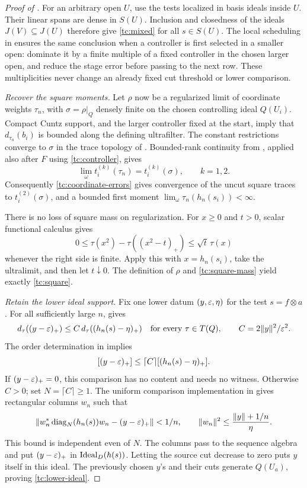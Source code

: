 \begin{proof}[Proof of ]
For an arbitrary open $U$, use the tests localized in basis ideals
inside $U$.  Their linear spans are dense in $S(U)$.  Inclusion and
closedness of the ideals $J(V)\subseteq J(U)$ therefore give
\eqref{tc:mixed} for all $s\in S(U)$.  The local scheduling in
 ensures the same conclusion when a controller is
first selected in a smaller open: dominate it by a finite multiple
of a fixed controller in the chosen larger open, and reduce the
stage error before passing to the next row.  These multiplicities
never change an already fixed cut threshold or lower comparison.

\smallskip\noindent\emph{Recover the square moments.} 
Let $\rho$ now be a regularized limit of coordinate weights $\tau_n$,
with $\sigma=\rho|_Q$ densely finite on the chosen controlling ideal
$Q(U_i)$.  Compact Cuntz support, and the larger controller fixed at
the start, imply that $d_{\tau_n}(b_i)$ is bounded along the defining
ultrafilter.  The constant restrictions converge to $\sigma$ in the
trace topology of .  Bounded-rank continuity
from , applied also after $F$ using
\eqref{tc:controller}, gives
\[
 \lim_\omega t_i^{(k)}(\tau_n)=t_i^{(k)}(\sigma),\qquad k=1,2.
\]
Consequently \eqref{tc:coordinate-errors} gives convergence of the
uncut square traces to $t_i^{(2)}(\sigma)$, and a bounded first
moment $\lim_\omega\tau_n(h_n(s_i))<\infty$.

There is no loss of square mass on regularization.  For $x\geq0$
and $t>0$, scalar functional calculus gives
\begin{equation}\label{tc:square-mass}
 0\leq\tau(x^2)-\tau((x^2-t)_+)
       \leq\sqrt t\,\tau(x)
\end{equation}
whenever the right side is finite.  Apply this with $x=h_n(s_i)$,
take the ultralimit, and then let $t\downarrow0$.  The definition of
$\rho$ and \eqref{tc:square-mass} yield exactly
\eqref{tc:square}.

\smallskip\noindent\emph{Retain the lower ideal support.} 
Fix one lower datum $(y,\varepsilon,\eta)$ for the test $s=f\otimes a$.
For all sufficiently large $n$,  gives
\[
 d_\tau((y-\varepsilon)_+)
       \leq C\,d_\tau((h_n(s)-\eta)_+)
       \quad\text{for every }\tau\in T(Q),
 \qquad C=2\|y\|^2/\varepsilon^2.
\]
The order determination in  implies
\[
 [(y-\varepsilon)_+]\leq
       \lceil C\rceil[(h_n(s)-\eta)_+].
\]
If $(y-\varepsilon)_+=0$, this comparison has no content and needs no
witness. Otherwise $C>0$; set $N=\lceil C\rceil\geq1$.
The uniform comparison implementation in
 gives rectangular columns $w_n$ such that
\[
 \left\|w_n^*\operatorname{diag}_N(h_n(s))w_n-(y-\varepsilon)_+\right\|
       <1/n,
 \qquad
 \|w_n\|^2\leq\frac{\|y\|+1/n}{\eta}.
\]
This bound is independent even of $N$.  The columns pass to the
sequence algebra and put $(y-\varepsilon)_+$ in $\operatorname{Ideal}_D(h(s))$.
Letting the source cut decrease to zero puts $y$ itself in this ideal.
The previously chosen $y$'s and
their cuts generate $Q(U_a)$, proving \eqref{tc:lower-ideal}.
\end{proof}
